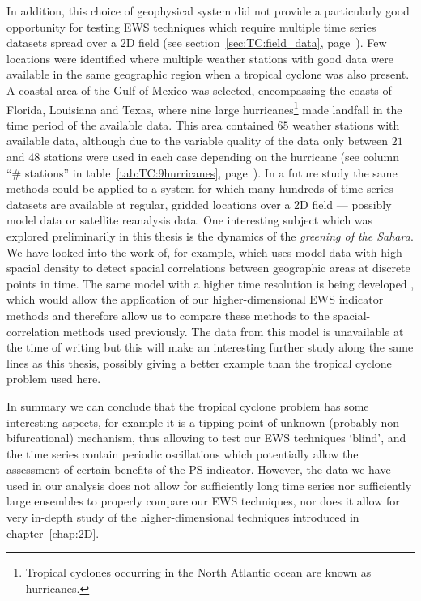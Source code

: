 In addition, this choice of geophysical system did not provide a particularly good opportunity for testing EWS techniques which require multiple time series datasets spread over a 2D field (see section~\ref{sec:TC:field_data}, page~\pageref{sec:TC:field_data}). Few locations were identified where multiple weather stations with good data were available in the same geographic region when a tropical cyclone was also present. A coastal area of the Gulf of Mexico was selected, encompassing the coasts of Florida, Louisiana and Texas, where nine large  hurricanes\footnote{Tropical cyclones occurring in the North Atlantic ocean are known as hurricanes.} made landfall in the time period of the available data. This area contained $65$ weather stations with available data, although due to the variable quality of the data only between $21$ and $48$ stations were used in each case depending on the hurricane (see column ``\# stations'' in table~\ref{tab:TC:9hurricanes}, page~\pageref{tab:TC:9hurricanes}). In a future study the same methods could be applied to a system for which many hundreds of time series datasets are available at regular, gridded locations over a 2D field — possibly model data or satellite reanalysis data. One interesting subject which was explored preliminarily in this thesis is the dynamics of the \emph{greening of the Sahara}. We have looked into the work of, for example, \cite{bathiany2013p1} which uses model data with high spacial density to detect spacial correlations between geographic areas at discrete points in time. The same model with a higher time resolution is being developed \citep{bathiany2013p2}, which would allow the application of our higher-dimensional EWS indicator methods and therefore allow us to compare these methods to the spacial-correlation methods used previously. The data from this model is unavailable at the time of writing but this will make an interesting further study along the same lines as this thesis, possibly giving a better example than the tropical cyclone problem used here. 

In summary we can conclude that the tropical cyclone problem has some interesting aspects, for example it is a tipping point of unknown (probably non-bifurcational) mechanism, thus allowing to test our EWS techniques `blind', and the time series contain periodic oscillations which potentially allow the assessment of certain benefits of the PS indicator. However, the data we have used in our analysis does not allow for sufficiently long time series nor sufficiently large ensembles to properly compare our EWS techniques, nor does it allow for very in-depth study of the higher-dimensional techniques introduced in chapter~\ref{chap:2D}.

